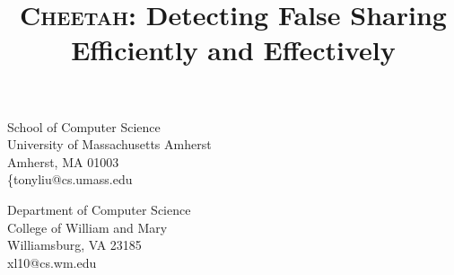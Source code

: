 \documentclass[10pt]{sigplanconf}
\date{} %
\newcommand{\punt}[1]{}
\newcommand{\Cheetah}{{\scshape Cheetah}}
\begin{document}
\setlength{\pdfpageheight}{\paperheight}
\setlength{\pdfpagewidth}{\paperwidth}



\title{{\huge \bf \Cheetah{}}: Detecting False Sharing Efficiently and Effectively}


{School of Computer Science \\
University of Massachusetts Amherst \\
Amherst, MA 01003 \\
{\{tonyliu}@cs.umass.edu}

{Department of Computer Science \\
College of William and Mary \\
Williamsburg, VA 23185 \\
xl10@cs.wm.edu}


\maketitle

\begin{abstract}


\end{abstract}



\punt{
\category{D.1.3}{Programming Techniques}{Concurrent Programming--Parallel Programming}
\category{D.2.5}{Software Engineering}{Testing and Debugging--Debugging Aids}

\terms
Design, Reliability, Performance

\keywords
False Sharing, Detection Tools, Performance 
}


\end{document}
